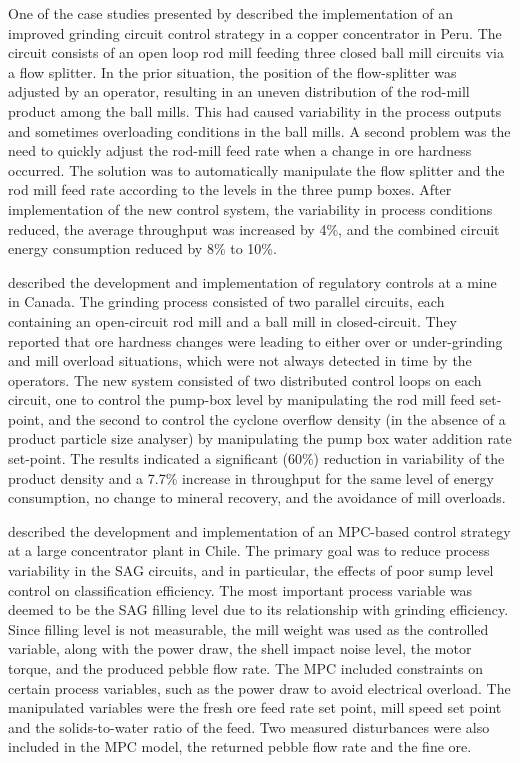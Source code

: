 One of the case studies presented by \cite{desbiens_using_2008} described the implementation of an improved grinding circuit control strategy in a copper concentrator in Peru. The circuit consists of an open loop rod mill feeding three closed ball mill circuits via a flow splitter. In the prior situation, the position of the flow-splitter was adjusted by an operator, resulting in an uneven distribution of the rod-mill product among the ball mills. This had caused variability in the process outputs and sometimes overloading conditions in the ball mills. A second problem was the need to quickly adjust the rod-mill feed rate when a change in ore hardness occurred. The solution was to automatically manipulate the flow splitter and the rod mill feed rate according to the levels in the three pump boxes. After implementation of the new control system, the variability in process conditions reduced, the average throughput was increased by 4\%, and the combined circuit energy consumption reduced by 8\% to 10\%.

\cite{nunez_self-optimizing_2009} described the development and implementation of regulatory controls at a mine in Canada. The grinding process consisted of two parallel circuits, each containing an open-circuit rod mill and a ball mill in closed-circuit. They reported that ore hardness changes were leading to either over or under-grinding and mill overload situations, which were not always detected in time by the operators. The new system consisted of two distributed control loops on each circuit, one to control the pump-box level by manipulating the rod mill feed set-point, and the second to control the cyclone overflow density (in the absence of a product particle size analyser) by manipulating the pump box water addition rate set-point. The results indicated a significant (60\%) reduction in variability of the product density and a 7.7\% increase in throughput for the same level of energy consumption, no change to mineral recovery, and the avoidance of mill overloads.

\cite{yutronic_sag_2011} described the development and implementation of an MPC-based control strategy at a large concentrator plant in Chile. The primary goal was to reduce process variability in the \gls{SAG} circuits, and in particular, the effects of poor sump level control on classification efficiency. The most important process variable was deemed to be the \gls{SAG} filling level due to its relationship with grinding efficiency. Since filling level is not measurable, the mill weight was used as the controlled variable, along with the power draw, the shell impact noise level, the motor torque, and the produced pebble flow rate. The MPC included constraints on certain process variables, such as the power draw to avoid electrical overload. The manipulated variables were the fresh ore feed rate set point, mill speed set point and the solids-to-water ratio of the feed. Two measured disturbances were also included in the MPC model, the returned pebble flow rate and the fine ore.

